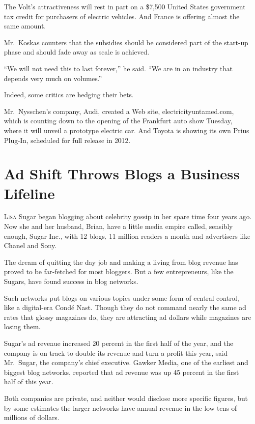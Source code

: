 ﻿\documentclass[12pt]{article}
\begin{document}
The Volt's attractiveness will rest in part on a \$7,500 United States government tax credit for
purchasers of electric vehicles. And France is offering almost the same amount.

Mr.~Koskas counters that the subsidies should be considered part of the start-up phase and should
fade away as scale is achieved.

``We will not need this to last forever,'' he said. ``We are in an industry that depends very much
on volumes.''

Indeed, some critics are hedging\cite{hedge} their bets.

Mr.~Nysschen's company, Audi, created a Web site, electricityuntamed.com, which is counting down to
the opening of the Frankfurt auto show Tuesday, where it will unveil a prototype electric car. And
Toyota is showing its own Prius Plug-In, scheduled for full release in 2012.

\section{Ad Shift Throws Blogs a Business Lifeline}

\lettrine{L}{isa} Sugar began blogging about celebrity\cite{celebrity} gossip in her spare time four
years ago. Now she and her husband, Brian, have a little media empire called, sensibly enough, Sugar
Inc., with 12 blogs, 11 million readers a month and advertisers like Chanel and Sony.

The dream of quitting the day job and making a living from blog revenue has proved to be far-fetched
for most bloggers. But a few entrepreneurs, like the Sugars, have found success in blog networks.

Such networks put blogs on various topics under some form of central control, like a digital-era
Cond\'e Nast. Though they do not command nearly the same ad rates that glossy magazines do, they are
attracting ad dollars while magazines are losing them.

Sugar's ad revenue increased 20 percent in the first half of the year, and the company is on track
to double its revenue and turn a profit this year, said Mr.~Sugar, the company's chief executive.
Gawker Media, one of the earliest and biggest blog networks, reported that ad revenue was up 45
percent in the first half of this year.

Both companies are private, and neither would disclose more specific figures, but by some estimates
the larger networks have annual revenue in the low tens of millions of dollars.
\end{document}
